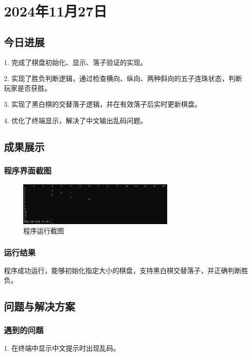 \section{2024年11月27日} %

\subsection{今日进展} %
1. 完成了棋盘初始化、显示、落子验证的实现。

2. 实现了胜负判断逻辑，通过检查横向、纵向、两种斜向的五子连珠状态，判断玩家是否获胜。

3. 实现了黑白棋的交替落子逻辑，并在有效落子后实时更新棋盘。

4. 优化了终端显示，解决了中文输出乱码问题。

\subsection{成果展示} %

\subsubsection{程序界面截图}
\begin{figure}[h]
    \centering
    \includegraphics[width=0.7\textwidth]{logs/image/0001.png}
    \caption{程序运行截图}
    \label{fig:program_output}
\end{figure}

\subsubsection{运行结果}
程序成功运行，能够初始化指定大小的棋盘，支持黑白棋交替落子，并正确判断胜负。

\subsection{问题与解决方案} %

\subsubsection{遇到的问题}
1. 在终端中显示中文提示时出现乱码。

